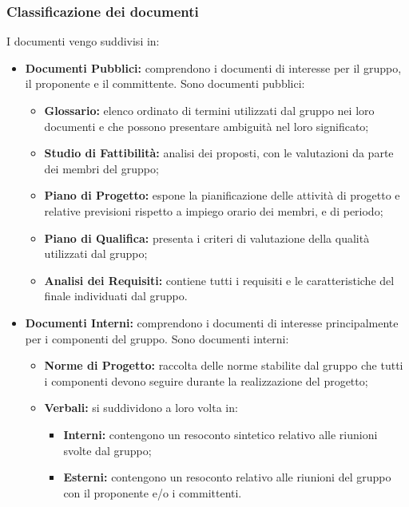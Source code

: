 \subsubsection{Classificazione dei documenti}\label{ClassificazioneDocumenti}
I documenti vengo suddivisi in:
\begin{itemize}
	\item \textbf{Documenti Pubblici:} comprendono i documenti di interesse per il gruppo, il proponente e il committente. 
	Sono documenti pubblici:
	\begin{itemize}
		\item \textbf{Glossario:} elenco ordinato di termini utilizzati dal gruppo nei loro documenti e che possono presentare ambiguità nel loro significato;
		\item \textbf{Studio di Fattibilità:} analisi dei  proposti, con le valutazioni da parte dei membri del gruppo;
		\item \textbf{Piano di Progetto:} espone la pianificazione delle attività di progetto e relative previsioni rispetto a impiego orario dei membri,  e  di periodo;
		\item \textbf{Piano di Qualifica:} presenta i criteri di valutazione della qualità utilizzati dal gruppo;
		\item \textbf{Analisi dei Requisiti:} contiene tutti i requisiti e le caratteristiche del  finale individuati dal gruppo.
	\end{itemize}
	\item \textbf{Documenti Interni:} comprendono i documenti di interesse principalmente per i componenti del gruppo.
	Sono documenti interni:
	\begin{itemize}
		\item \textbf{Norme di Progetto:} raccolta delle norme stabilite dal gruppo che tutti i componenti devono seguire durante la realizzazione del progetto;
		\item \textbf{Verbali:} si suddividono a loro volta in:
		\begin{itemize}
			\item \textbf{Interni:} contengono un resoconto sintetico relativo alle riunioni svolte dal gruppo;
			\item \textbf{Esterni:} contengono un resoconto relativo alle riunioni del gruppo con il proponente e/o i committenti.
		\end{itemize}
	\end{itemize}
\end{itemize}


